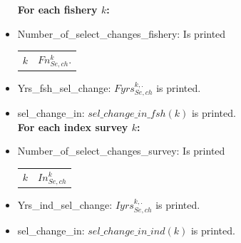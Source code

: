 \documentclass{article}
\begin{document}
\begin{itemize}
    \textbf{For each fishery $k$:}
    \item Number\_of\_select\_changes\_fishery: Is printed
    \begin{center}
        \begin{tabular}{c c}
            $k$ & $Fn_{Se,ch}^k$. \\
        \end{tabular}
    \end{center}
    \item Yrs\_fsh\_sel\_change: $Fyrs_{Se,ch}^{k,.}$ is printed.
    \item sel\_change\_in: $sel\_change\_in\_fsh(k)$ is printed.\\

    \textbf{For each index survey $k$:}
    \item Number\_of\_select\_changes\_survey: Is printed
    \begin{center}
        \begin{tabular}{c c}
           $k$  & $In_{Se,ch}^k$  \\
        \end{tabular}
    \end{center}
    \item Yrs\_ind\_sel\_change: $Iyrs_{Se,ch}^{k,.}$ is printed.
    \item sel\_change\_in:  $sel\_change\_in\_ind(k)$ is printed.

     
    \end{itemize}    
\end{document}
